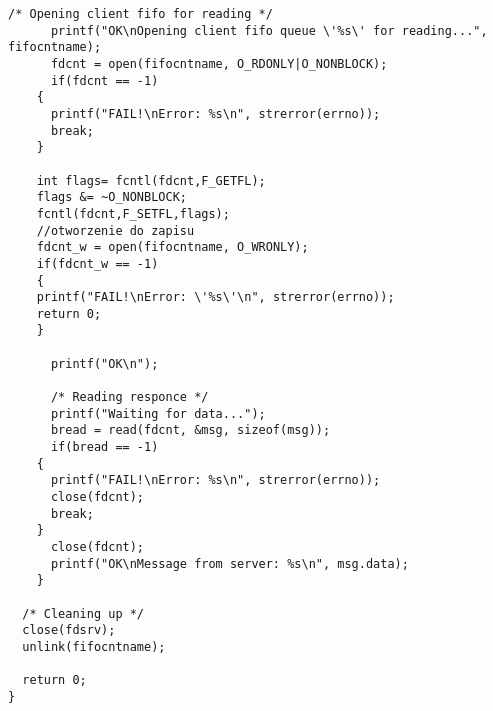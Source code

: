 \documentclass[a4paper,15pt]{article}
\begin{document}
\begin{lstlisting}[style=CStyle, label=some-code, caption=cnteliza.c]
      /* Opening client fifo for reading */
      printf("OK\nOpening client fifo queue \'%s\' for reading...", fifocntname);
      fdcnt = open(fifocntname, O_RDONLY|O_NONBLOCK);
      if(fdcnt == -1)
	{
	  printf("FAIL!\nError: %s\n", strerror(errno));
	  break;
	}

	int flags= fcntl(fdcnt,F_GETFL);
	flags &= ~O_NONBLOCK;
	fcntl(fdcnt,F_SETFL,flags);
	//otworzenie do zapisu
	fdcnt_w = open(fifocntname, O_WRONLY);
	if(fdcnt_w == -1)
	{
	printf("FAIL!\nError: \'%s\'\n", strerror(errno));
	return 0;
	}

      printf("OK\n");
      
      /* Reading responce */
      printf("Waiting for data...");
      bread = read(fdcnt, &msg, sizeof(msg));
      if(bread == -1)
	{
	  printf("FAIL!\nError: %s\n", strerror(errno));
	  close(fdcnt);
	  break;
	}
      close(fdcnt);
      printf("OK\nMessage from server: %s\n", msg.data);
    }

  /* Cleaning up */
  close(fdsrv);
  unlink(fifocntname);

  return 0;
}



\end{lstlisting}
\end{document}
